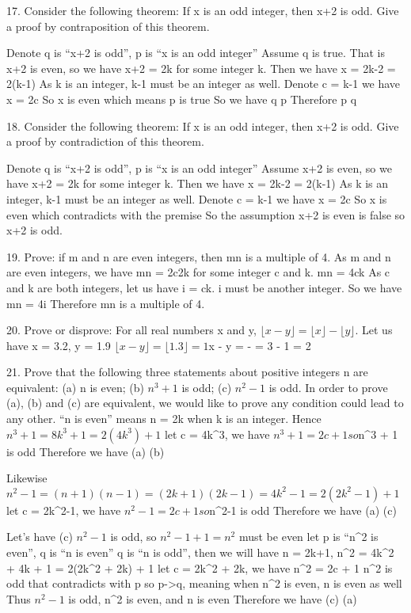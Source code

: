 \documentclass{article}
\begin{document}
17. Consider the following theorem: If x is an odd integer, then x+2 is odd. Give a proof by contraposition of this theorem.

Denote q is ``x+2 is odd'', p is ``x is an odd integer''
Assume \lnot q is true. That is x+2 is even, so we have x+2 = 2k for some integer k.
Then we have x = 2k-2 = 2(k-1)
As k is an integer, k-1 must be an integer as well. Denote c = k-1 we have x = 2c
So x is even which means \lnot p is true
So we have \lnot q \to \lnot p
Therefore p \to q

18. Consider the following theorem: If x is an odd integer, then x+2 is odd. Give a proof by contradiction of this theorem.

Denote q is ``x+2 is odd'', p is ``x is an odd integer''
Assume x+2 is even, so we have x+2 = 2k for some integer k.
Then we have x = 2k-2 = 2(k-1)
As k is an integer, k-1 must be an integer as well. Denote c = k-1 we have x = 2c
So x is even which contradicts with the premise
So the assumption x+2 is even is false so x+2 is odd.

19. Prove: if m and n are even integers, then mn is a multiple of 4.
As m and n are even integers, we have mn = 2c2k for some integer c and k.
mn = 4ck
As c and k are both integers, let us have i = ck. i must be another integer.
So we have mn = 4i
Therefore mn is a multiple of 4.

20. Prove or disprove: For all real numbers x and y, $\lfloor x-y\rfloor =\lfloor x \rfloor -\lfloor y \rfloor$.
Let us have x = 3.2, y = 1.9
$\lfloor x-y\rfloor = \lfloor 1.3 \rfloor = 1
$\lfloor x \rfloor - \lfloor y \rfloor =  \rfloor -  \rfloor = 3 - 1 = 2

21. Prove that the following three statements about positive integers n are equivalent: (a) n is even; (b) $n^3+1$ is odd; (c) $n^2-1$ is odd.
In order to prove (a), (b) and (c) are equivalent, we would like to prove any condition could lead to any other.
``n is even'' means n = 2k when k is an integer.
Hence $n^3 + 1 = 8k^3 + 1 = 2(4k^3) + 1$
let c = 4k^3, we have $n^3 + 1 = 2c + 1
so $n^3 + 1 is odd
Therefore we have (a) \to (b)

Likewise $n^2-1 = (n+1)(n-1) = (2k+1)(2k-1) = 4k^2 - 1 = 2(2k^2-1) + 1$
let c = 2k^2-1, we have $n^2-1 = 2c + 1
so $n^2-1 is odd
Therefore we have (a) \to (c)

Let's have (c) $n^2-1$ is odd, so $n^2 - 1 + 1 = n^2$ must be even
let p is ``n^2 is even'', q is ``n is even''
\lnot q is ``n is odd'', then we will have n = 2k+1, n^2 = 4k^2 + 4k + 1 = 2(2k^2 + 2k) + 1
let c = 2k^2 + 2k, we have n^2 = 2c + 1
n^2 is odd that contradicts with p
so p->q, meaning when n^2 is even, n is even as well
Thus $n^2-1$ is odd, n^2 is even, and n is even
Therefore we have (c) \to (a)
\end{document}
